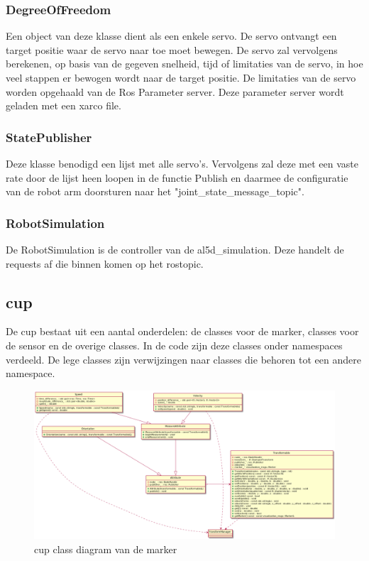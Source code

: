 \documentclass[11pt,titlepage]{article}
\begin{document}
\subsubsection{DegreeOfFreedom}
Een object van deze klasse dient als een enkele servo. De servo ontvangt een target positie waar de servo naar toe moet bewegen. De servo zal vervolgens berekenen, op basis van de gegeven snelheid, tijd of limitaties van de servo, in hoe veel stappen er bewogen wordt naar de target positie. De limitaties van de servo worden opgehaald van de Ros Parameter server. Deze parameter server wordt geladen met een xarco file.

\subsubsection{StatePublisher}
Deze klasse benodigd een lijst met alle servo's. Vervolgens zal deze met een vaste rate door de lijst heen loopen in de functie Publish en daarmee de configuratie van de robot arm doorsturen naar het "joint\_state\_message\_topic".

\subsubsection{RobotSimulation}
De RobotSimulation is de controller van de al5d\_simulation. Deze handelt de requests af die binnen komen op het rostopic.

\subsection{cup}

De cup bestaat uit een aantal onderdelen: de classes voor de marker, classes voor de sensor en de overige classes. In de code zijn deze classes onder namespaces verdeeld. De lege classes zijn verwijzingen naar classes die behoren tot een andere namespace.

\begin{figure}[H]
\centering
    \includegraphics[scale = .25]{cup_class_diagram_marker.png}
    \caption{cup class diagram van de marker}
    \label{figure:cup_class_diagram_marker}
\end{figure}
\end{document}
